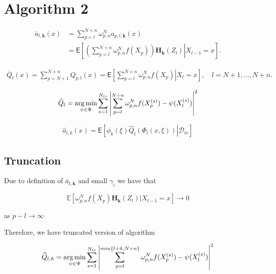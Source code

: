 \documentclass[a4paper]{article}
\newcommand*{\argmin}{\operatornamewithlimits{arg\,min}}
\begin{document}
\section{Algorithm 2}

\begin{align*}
\bar{a}_{l,\mathbf{k}}(x)
& =\sum_{p=l}^{N+n}\omega_{p,n}^{N}a_{p,l,\mathbf{k}}(x)\\
& =\mathsf{E}\left[\left.\left(\sum_{p=l}^{N+n}\omega_{p,n}^{N}f(X_{p})\right)\mathbf{H}_\mathbf{k}\left(Z_{l}\right)\right|X_{l-1}=x\right].
\end{align*}

\begin{eqnarray*}
\bar{Q}_{l}(x)=\sum_{p=N+1}^{N+n}Q_{p,l}\left(x\right)=\mathsf{E}\left[\left.\sum_{p=l}^{N+n}\omega_{p,n}^{N}f(X_{p})\right|X_{l}=x\right],\quad l=N+1,\ldots,N+n.
\end{eqnarray*}

\begin{equation}
{\widehat  Q}_{l}=\argmin_{\psi\in \Psi}\sum_{s=1}^{N_{tr}} \left | \sum_{p=l}^{N+n}\omega_{p,n}^{N}f(X^{(s)}_{p})-\psi(X^{(s)}_{l})\right|^2
\end{equation}

\begin{eqnarray*}
\widehat a_{l,k}(x)=\mathsf{E}\left[\left.\phi_k\left(\xi\right)\widehat Q_{l}\left(\Phi_l(x,\xi)\right)\right | \mathcal{D}_{tr}\right]
\end{eqnarray*}

\subsection{Truncation}
Due to definition of $\bar{a}_{l,\mathbf{k}}$ and small $\gamma_i$ we have that 

\begin{equation*}
\mathbb{E} \left[ \omega_{p,n}^{N}f(X_{p})\mathbf{H}_\mathbf{k}\left(Z_{l}\right)|X_{l-1}=x \right] \rightarrow  0 
\end{equation*}

as $p-l \rightarrow \infty$

Therefore, we have truncated version of algorithm

\begin{equation}
{\widehat  Q}_{l, \tilde{n}}=\argmin_{\psi\in \Psi}\sum_{s=1}^{N_{tr}} \left | \sum_{p=l}^{min\left\{ l+ \tilde{n}, N + n \right\} }\omega_{p,n}^{N}f(X^{(s)}_{p})-\psi(X^{(s)}_{l})\right|^2
\end{equation}
\end{document}

